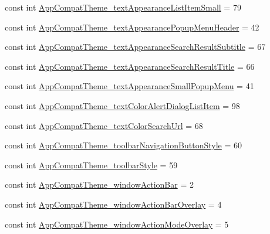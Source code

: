 \begin{DoxyCompactItemize}
\item 
const int \mbox{\hyperlink{class_f_w_p_s___app_1_1_droid_1_1_resource_1_1_styleable_a0e6e66d7348143b06762912cb08551c0}{App\+Compat\+Theme\+\_\+text\+Appearance\+List\+Item\+Small}} = 79
\item 
const int \mbox{\hyperlink{class_f_w_p_s___app_1_1_droid_1_1_resource_1_1_styleable_a5aafa61a59a415c2b1a6988fec4a0434}{App\+Compat\+Theme\+\_\+text\+Appearance\+Popup\+Menu\+Header}} = 42
\item 
const int \mbox{\hyperlink{class_f_w_p_s___app_1_1_droid_1_1_resource_1_1_styleable_a23d4db202a23501c85cefef6c9a5f0dd}{App\+Compat\+Theme\+\_\+text\+Appearance\+Search\+Result\+Subtitle}} = 67
\item 
const int \mbox{\hyperlink{class_f_w_p_s___app_1_1_droid_1_1_resource_1_1_styleable_acafd3f7678967e21d27eec2eda465b2c}{App\+Compat\+Theme\+\_\+text\+Appearance\+Search\+Result\+Title}} = 66
\item 
const int \mbox{\hyperlink{class_f_w_p_s___app_1_1_droid_1_1_resource_1_1_styleable_a63aa98f7142e8f2414bb2c3712511af4}{App\+Compat\+Theme\+\_\+text\+Appearance\+Small\+Popup\+Menu}} = 41
\item 
const int \mbox{\hyperlink{class_f_w_p_s___app_1_1_droid_1_1_resource_1_1_styleable_a62aef39d48164212e2f77908376d6848}{App\+Compat\+Theme\+\_\+text\+Color\+Alert\+Dialog\+List\+Item}} = 98
\item 
const int \mbox{\hyperlink{class_f_w_p_s___app_1_1_droid_1_1_resource_1_1_styleable_a1e25de6985f0008911d347698af1d39c}{App\+Compat\+Theme\+\_\+text\+Color\+Search\+Url}} = 68
\item 
const int \mbox{\hyperlink{class_f_w_p_s___app_1_1_droid_1_1_resource_1_1_styleable_ac6ea8052bddc93c8b1f5857855dd375e}{App\+Compat\+Theme\+\_\+toolbar\+Navigation\+Button\+Style}} = 60
\item 
const int \mbox{\hyperlink{class_f_w_p_s___app_1_1_droid_1_1_resource_1_1_styleable_a872a191169218d7c8dc8b1e6ebc30274}{App\+Compat\+Theme\+\_\+toolbar\+Style}} = 59
\item 
const int \mbox{\hyperlink{class_f_w_p_s___app_1_1_droid_1_1_resource_1_1_styleable_a07bf6a281186f5e08339cc97b4423da5}{App\+Compat\+Theme\+\_\+window\+Action\+Bar}} = 2
\item 
const int \mbox{\hyperlink{class_f_w_p_s___app_1_1_droid_1_1_resource_1_1_styleable_a489e6cf094bf80c21f45fe7fc19b63c2}{App\+Compat\+Theme\+\_\+window\+Action\+Bar\+Overlay}} = 4
\item 
const int \mbox{\hyperlink{class_f_w_p_s___app_1_1_droid_1_1_resource_1_1_styleable_a6a617ef1390a7a94a7cc8d81b44c5211}{App\+Compat\+Theme\+\_\+window\+Action\+Mode\+Overlay}} = 5

\end{DoxyCompactItemize}
